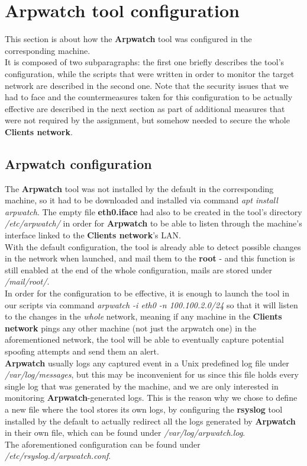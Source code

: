 \section{Arpwatch tool configuration}
This section is about how the \textbf{Arpwatch} tool was configured in the corresponding machine.\\
It is composed of two subparagraphs: the first one briefly describes the tool's configuration, while the
scripts that were written in order to monitor the target network are described in the second one. Note that the security issues that we had to face and the countermeasures taken for this configuration to be actually effective are described in the next section as part of additional measures that were not required by the assignment, but somehow needed to secure the whole \textbf{Clients network}.\\

\subsection{Arpwatch configuration}
The \textbf{Arpwatch} tool was not installed by the default in the corresponding machine, so it had to be downloaded and installed via command \textit{apt install arpwatch}. The empty file \textbf{eth0.iface} had also to be created in the tool's directory \textit{/etc/arpwatch/} in order for \textbf{Arpwatch} to be able to listen through the machine's interface linked to the \textbf{Clients network}'s LAN.\\
With the default configuration, the tool is already able to detect possible changes in the network when launched, and mail them to the \textbf{root} - and this function is still enabled at the end of the whole configuration, mails are stored under \textit{/mail/root/}.\\
In order for the configuration to be effective, it is enough to launch the tool in our scripts via command \textit{arpwatch -i eth0 -n 100.100.2.0/24} so that it will listen to the changes in the \textit{whole} network, meaning if any machine in the \textbf{Clients network} pings any other machine (not just the arpwatch one) in the aforementioned network, the tool will be able to eventually capture potential spoofing attempts and send them an alert.\\
\textbf{Arpwatch} usually logs any captured event in a Unix predefined log file under \textit{/var/log/messages}, but this may be inconvenient for us since this file holds every single log that was generated by the machine, and we are only interested in monitoring \textbf{Arpwatch}-generated logs. This is the reason why we chose to define a new file where the tool stores its own logs, by configuring the \textbf{rsyslog} tool installed by the default to actually redirect all the logs generated by \textbf{Arpwatch} in their own file, which can be found under \textit{/var/log/arpwatch.log}.\\
The aforementioned configuration can be found under \textit{/etc/rsyslog.d/arpwatch.conf}.\\

